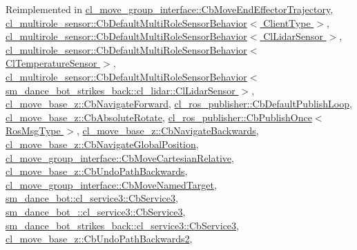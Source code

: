 Reimplemented in \hyperlink{classcl__move__group__interface_1_1CbMoveEndEffectorTrajectory_aaedd074fd178c6390a4a3f1ccff23ad3}{cl\+\_\+move\+\_\+group\+\_\+interface\+::\+Cb\+Move\+End\+Effector\+Trajectory}, \hyperlink{classcl__multirole__sensor_1_1CbDefaultMultiRoleSensorBehavior_a5ac29f93cc91e23715f51ade94467cae}{cl\+\_\+multirole\+\_\+sensor\+::\+Cb\+Default\+Multi\+Role\+Sensor\+Behavior$<$ Client\+Type $>$}, \hyperlink{classcl__multirole__sensor_1_1CbDefaultMultiRoleSensorBehavior_a5ac29f93cc91e23715f51ade94467cae}{cl\+\_\+multirole\+\_\+sensor\+::\+Cb\+Default\+Multi\+Role\+Sensor\+Behavior$<$ Cl\+Lidar\+Sensor $>$}, \hyperlink{classcl__multirole__sensor_1_1CbDefaultMultiRoleSensorBehavior_a5ac29f93cc91e23715f51ade94467cae}{cl\+\_\+multirole\+\_\+sensor\+::\+Cb\+Default\+Multi\+Role\+Sensor\+Behavior$<$ Cl\+Temperature\+Sensor $>$}, \hyperlink{classcl__multirole__sensor_1_1CbDefaultMultiRoleSensorBehavior_a5ac29f93cc91e23715f51ade94467cae}{cl\+\_\+multirole\+\_\+sensor\+::\+Cb\+Default\+Multi\+Role\+Sensor\+Behavior$<$ sm\+\_\+dance\+\_\+bot\+\_\+strikes\+\_\+back\+::cl\+\_\+lidar\+::\+Cl\+Lidar\+Sensor $>$}, \hyperlink{classcl__move__base__z_1_1CbNavigateForward_af9a2e49071de287922c3f5963a079b95}{cl\+\_\+move\+\_\+base\+\_\+z\+::\+Cb\+Navigate\+Forward}, \hyperlink{classcl__ros__publisher_1_1CbDefaultPublishLoop_a6e6cfb477cbefc510ca7b55a061545e4}{cl\+\_\+ros\+\_\+publisher\+::\+Cb\+Default\+Publish\+Loop}, \hyperlink{classcl__move__base__z_1_1CbAbsoluteRotate_a10418ea360809fa649d295716b152b2b}{cl\+\_\+move\+\_\+base\+\_\+z\+::\+Cb\+Absolute\+Rotate}, \hyperlink{classcl__ros__publisher_1_1CbPublishOnce_afaed71bc2694ec1837278d5f931a76e1}{cl\+\_\+ros\+\_\+publisher\+::\+Cb\+Publish\+Once$<$ Ros\+Msg\+Type $>$}, \hyperlink{classcl__move__base__z_1_1CbNavigateBackwards_a545a5282f0ef6b0080b46002d6037567}{cl\+\_\+move\+\_\+base\+\_\+z\+::\+Cb\+Navigate\+Backwards}, \hyperlink{classcl__move__base__z_1_1CbNavigateGlobalPosition_a66d8b0555ef2945bc108dcd5171be292}{cl\+\_\+move\+\_\+base\+\_\+z\+::\+Cb\+Navigate\+Global\+Position}, \hyperlink{classcl__move__group__interface_1_1CbMoveCartesianRelative_a7d65e3d5fa3f2c7b47d9cbe631f448ad}{cl\+\_\+move\+\_\+group\+\_\+interface\+::\+Cb\+Move\+Cartesian\+Relative}, \hyperlink{classcl__move__base__z_1_1CbUndoPathBackwards_a32e680530375b62c7053bf173f6b2b1b}{cl\+\_\+move\+\_\+base\+\_\+z\+::\+Cb\+Undo\+Path\+Backwards}, \hyperlink{classcl__move__group__interface_1_1CbMoveNamedTarget_ab212edda280e896977d7ac567e4c1b29}{cl\+\_\+move\+\_\+group\+\_\+interface\+::\+Cb\+Move\+Named\+Target}, \hyperlink{classsm__dance__bot_1_1cl__service3_1_1CbService3_ae9e3796b507ad96cc0890fec0f64a4b7}{sm\+\_\+dance\+\_\+bot\+::cl\+\_\+service3\+::\+Cb\+Service3}, \hyperlink{classsm__dance__bot__2_1_1cl__service3_1_1CbService3_a179e43cc240f53f9c49c67094e41d75f}{sm\+\_\+dance\+\_\+bot\+\_\+::cl\+\_\+service3\+::\+Cb\+Service3}, \hyperlink{classsm__dance__bot__strikes__back_1_1cl__service3_1_1CbService3_a09a2fda38973e1e3915b63a47ca67ed1}{sm\+\_\+dance\+\_\+bot\+\_\+strikes\+\_\+back\+::cl\+\_\+service3\+::\+Cb\+Service3}, \hyperlink{classcl__move__base__z_1_1CbUndoPathBackwards2_a1b96187df9be6ce0fbdb5511147685d3}{cl\+\_\+move\+\_\+base\+\_\+z\+::\+Cb\+Undo\+Path\+Backwards2}, 